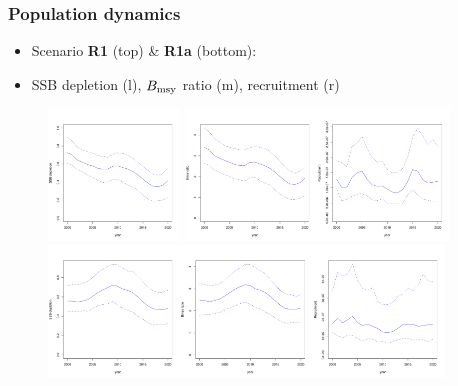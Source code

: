 \documentclass{beamer}
\newcommand{\bmsy}{B_{\rm msy}}
\begin{document}
\begin{frame}
    \frametitle{Population dynamics}
\begin{itemize}
    \item Scenario \textbf{R1} (top) \& \textbf{R1a} (bottom):
    \item SSB depletion (l), $\bmsy$ ratio (m), recruitment (r)
\end{itemize}
\begin{figure}
\begin{center}
       \includegraphics[width=3.5cm,height=3.5cm]{figs/case4_dep.pdf} \includegraphics[width=3.5cm,height=3.5cm]{figs/case4_bmsy.pdf}\includegraphics[width=3.5cm,height=3.5cm]{figs/case4_rec.pdf}
        \includegraphics[width=3.5cm,height=3.5cm]{figs/case4a_dep.pdf}\includegraphics[width=3.5cm,height=3.5cm]{figs/case4a_bmsy.pdf}\includegraphics[width=3.5cm,height=3.5cm]{figs/case4a_rec.pdf} 
    \end{center}
\end{figure}
\end{frame}
\end{document}
